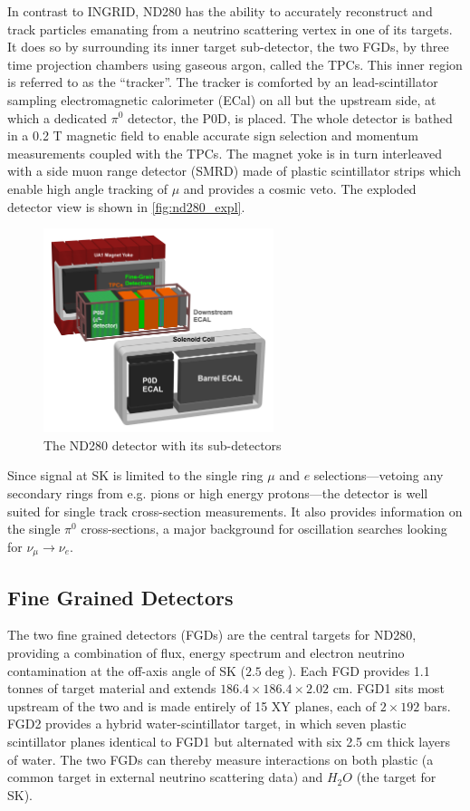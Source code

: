 In contrast to INGRID, ND280 has the ability to accurately reconstruct and track particles emanating from a neutrino scattering vertex in one of its targets. It does so by surrounding its inner target sub-detector, the two FGDs, by three time projection chambers using gaseous argon, called the TPCs. This inner region is referred to as the ``tracker''. The tracker is comforted by an lead-scintillator sampling electromagnetic calorimeter (ECal) on all but the upstream side, at which a dedicated $\pi^0$ detector, the P0D, is placed. The whole detector is bathed in a 0.2 T magnetic field to enable accurate sign selection and momentum measurements coupled with the TPCs. The magnet yoke is in turn interleaved with a side muon range detector (SMRD) made of plastic scintillator strips which enable high angle tracking of $\mu$ and provides a cosmic veto. The exploded detector view is shown in \autoref{fig:nd280_expl}.
\begin{figure}[h]
	\includegraphics[width=0.6\textwidth, trim={0mm 0mm 0mm 0mm}, clip,page=1]{figures/det_chap/view/ND280Exploded-Text-Transparent-Large}
	\caption{The ND280 detector with its sub-detectors}
	\label{fig:nd280_expl}
\end{figure}

Since signal at SK is limited to the single ring $\mu$ and $e$ selections---vetoing any secondary rings from e.g. pions or high energy protons---the detector is well suited for single track cross-section measurements. It also provides information on the single $\pi^0$ cross-sections, a major background for oscillation searches looking for $\nu_\mu \rightarrow \nu_e$.

\subsection{Fine Grained Detectors}
The two fine grained detectors (FGDs)\cite{t2k_fgd} are the central targets for ND280, providing a combination of flux, energy spectrum and electron neutrino contamination at the off-axis angle of SK ($2.5\deg$). Each FGD provides 1.1 tonnes of target material and extends $186.4\times186.4\times2.02\text{ cm}$. FGD1 sits most upstream of the two and is made entirely of 15 XY planes, each of $2\times192$ bars. FGD2 provides a hybrid water-scintillator target, in which seven plastic scintillator planes identical to FGD1 but alternated with six 2.5 cm thick layers of water. The two FGDs can thereby measure interactions on both plastic (a common target in external neutrino scattering data) and $H_2 O$ (the target for SK).

